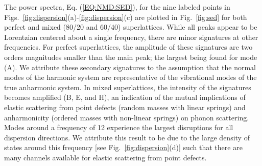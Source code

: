 \documentclass[aps,prb,preprint,preprintnumbers,amsmath,amssymb,floatfix,superscriptaddress]{revtex4}
\begin{document}
The power spectra, Eq. (\ref{EQ:NMD:SED}), for the nine labeled points in Figs.~\ref{fig:dispersion}(a)-\ref{fig:dispersion}(c) are plotted in Fig.~\ref{fig:sed} for both perfect and mixed (80/20 and 60/40) superlattices. While all peaks appear to be Lorentzian centered about a single frequency, there are minor signatures at other frequencies. For perfect superlattices, the amplitude of these signatures are two orders magnitudes smaller than the main peak; the largest being found for mode (A). We attribute these secondary signatures to the assumption that the normal modes of the harmonic system are representative of the vibrational modes of the true anharmonic system. In mixed superlattices, the intensity of the signatures becomes amplified (B, E, and H), an indication of the mutual implications of elastic scattering from point defects (random masses with linear springs) and anharmonicity (ordered masses with non-linear springs) on phonon scattering. \cite{RevModPhys.53.175}  Modes around a frequency of 12 experience the largest disruptions for all dispersion directions. We attribute this result to be due to the large density of states around this frequency [see Fig.~\ref{fig:dispersion}(d)] such that there are many channels available for elastic scattering from point defects.\cite{tamura_isotope_1983} 
\end{document}
